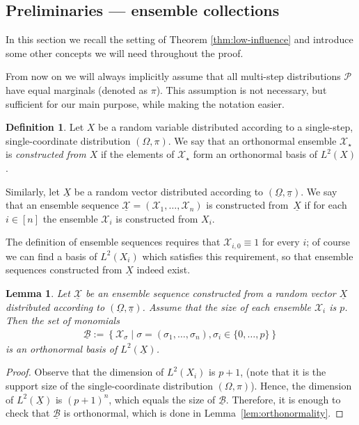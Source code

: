 \documentclass{daj}
\newcommand{\1}{\mathbbm{1}}
\theoremstyle{plain}
\newtheorem{lemma}[theorem]{Lemma}
\theoremstyle{definition}
\newtheorem{definition}[theorem]{Definition}
\newcommand{\cP}{\mathcal{P}}
\begin{document}
\subsection{Preliminaries --- ensemble collections}
\label{sec:app-pre-2}

In this section we recall the setting of Theorem \ref{thm:low-influence}
and introduce some other concepts we will need throughout the proof.

From now on we will always implicitly assume that all multi-step distributions 
$\cP$ have equal marginals (denoted as $\pi$). 
This assumption is not necessary, but sufficient for our main purpose,
while making the notation easier.

\begin{definition}
Let $X$ be a random variable distributed according to a 
single-step, single-coordinate distribution $(\Omega, \pi)$.
We say that an orthonormal ensemble $\mathcal{X}_\star$ is
\emph{constructed from $X$} if the elements
of $\mathcal{X}_\star$ form an orthonormal basis of $L^2(X)$.

Similarly, let $\underline{X}$ be a random vector distributed
according to $(\underline{\Omega}, \underline{\pi})$.
We say that an ensemble sequence $\underline{\mathcal{X}} = 
(\mathcal{X}_1, \ldots, \mathcal{X}_n)$ is constructed 
from~$\underline{X}$ if for each $i \in [n]$ 
the ensemble $\mathcal{X}_i$ is constructed from $X_i$.
\end{definition}

The definition of ensemble sequences requires that $\mathcal{X}_{i,0}
\equiv 1$ for every $i$; of course we can find a basis 
of $L^2({X}_i)$ which satisfies this requirement, so that 
ensemble sequences constructed from $\underline{X}$ indeed exist.

\begin{lemma}
\label{lem:product-base}
Let $\underline{\mathcal{X}}$ be an ensemble sequence constructed
from a random vector 
${\underline{X}}$ distributed according to
$({\underline{\Omega}}, \underline{\pi})$.
Assume that the size of each ensemble $\mathcal{X}_i$ is $p$.
Then the set of monomials
\begin{align*}
  \underline{\mathcal{B}} :=
  \left\{ \mathcal{X}_\sigma \mid \sigma = (\sigma_1, \ldots, \sigma_n),
  \sigma_i \in \{0, \ldots, p\} \right\}
\end{align*}
is an orthonormal basis of $L^2({\underline{X}})$.
\end{lemma}

\begin{proof}
Observe that the dimension of $L^2({X}_i)$ is $p+1$, (note that
it is the support size of the single-coordinate distribution 
$(\Omega, \pi)$).
Hence, the dimension of $L^2(\underline{X})$ is $(p+1)^n$,
which equals the size of $\underline{\mathcal{B}}$.
Therefore, it is enough to check that $\underline{\mathcal{B}}$ is
orthonormal, which is done in Lemma~\ref{lem:orthonormality}. 
\end{proof}
\end{document}
